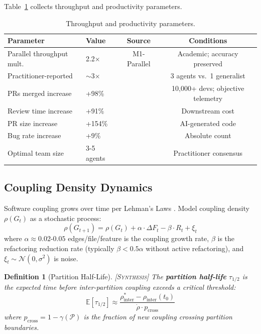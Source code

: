 \documentclass[11pt, a4paper, logo, copyright]{googledeepmind}
\newtheorem{definition}{Definition}[section]
\newcommand{\synthesis}{\textsc{[Synthesis]}}
\begin{document}
Table~\ref{tab:throughput-params} collects throughput and productivity parameters.

\begin{table}[ht]
\centering
\caption{Throughput and productivity parameters.}
\label{tab:throughput-params}
\small
\begin{tabular}{llcc}
\toprule
\textbf{Parameter} & \textbf{Value} & \textbf{Source} & \textbf{Conditions} \\
\midrule
Parallel throughput mult. & 2.2$\times$ & M1-Parallel & Academic; accuracy preserved \\
Practitioner-reported & $\sim$3$\times$ & \citet{Osmani2025} & 3 agents vs.\ 1 generalist \\
PRs merged increase & +98\% & \citet{DORA2025} & 10,000+ devs; objective telemetry \\
Review time increase & +91\% & \citet{DORA2025} & Downstream cost \\
PR size increase & +154\% & \citet{DORA2025} & AI-generated code \\
Bug rate increase & +9\% & \citet{DORA2025} & Absolute count \\
Optimal team size & 3-5 agents & \citet{Osmani2025} & Practitioner consensus \\
\bottomrule
\end{tabular}
\end{table}

\subsection{Coupling Density Dynamics}

Software coupling grows over time per Lehman's Laws \citep{Lehman1980}.
Model coupling density $\rho(G_t)$ as a stochastic process:
\begin{equation}
  \rho(G_{t+1}) = \rho(G_t) + \alpha \cdot \Delta F_t - \beta \cdot R_t + \xi_t
\end{equation}
where $\alpha \approx 0.02$-$0.05$ edges/file/feature is the coupling growth rate, $\beta$ is the refactoring reduction rate (typically $\beta < 0.5\alpha$ without active refactoring), and $\xi_t \sim \mathcal{N}(0, \sigma^2)$ is noise.

\begin{definition}[Partition Half-Life] \synthesis{}
The \textbf{partition half-life} $\tau_{1/2}$ is the expected time before inter-partition coupling exceeds a critical threshold:
\begin{equation}
  \mathbb{E}[\tau_{1/2}] \approx \frac{\rho_{\mathrm{inter}}^* - \rho_{\mathrm{inter}}(t_0)}{\dot{\rho} \cdot p_{\mathrm{cross}}}
\end{equation}
where $p_{\mathrm{cross}} = 1 - \gamma(\mathcal{P})$ is the fraction of new coupling crossing partition boundaries.
\end{definition}
\end{document}
